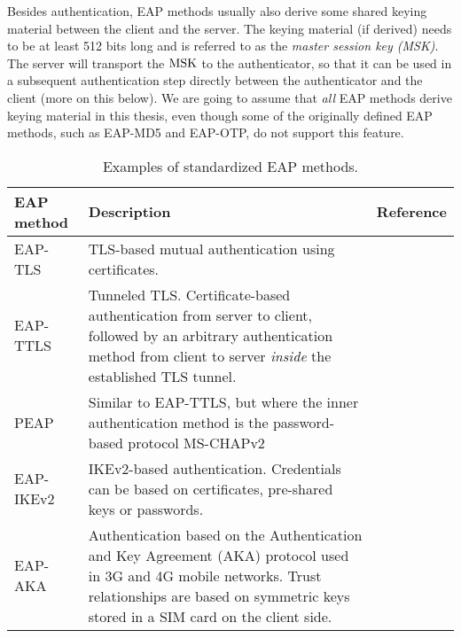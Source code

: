 Besides authentication,  EAP methods usually also derive some shared keying material between the client and the server.
The keying material (if derived) needs to be at least 512 bits long and is referred to as the \emph{master session key (MSK)}.
The server will transport the $\mathrm{MSK}$ to the authenticator,
so that it can be used in a subsequent authentication step directly between the authenticator and the client (more on this below). 
We are going to assume that \emph{all} EAP methods derive keying material in this thesis,
even though some of the originally defined EAP methods, such as EAP-MD5 and EAP-OTP, do not support this feature.




\begin{table}

	\normalsize
	\centering

	\caption{Examples of standardized EAP methods.
	}
	
	\label{table:EAP_methods}
	
	
	\begin{tabular}{l p{9cm} l}  
		\toprule
		

		
		EAP method & Description & Reference  \\
		
		\midrule
		
		EAP-TLS & TLS-based mutual authentication using certificates.	& \cite{IETF:RFC5216:EAP-TLS} \\
		
		EAP-TTLS & Tunneled TLS. Certificate-based authentication from server to client, 
		followed by an arbitrary authentication method from client to server \emph{inside} the established TLS tunnel.  & \cite{IETF:RFC5281:EAP-TTLS}  \\
		
		PEAP & Similar to EAP-TTLS, but where  the inner authentication method is the password-based protocol MS-CHAPv2~\cite{IETF:RFC2759:MS-CHAPv2}   & \cite{IETF:draft:PEAPv2} \\
		
		EAP-IKEv2 & IKEv2-based \cite{IETF:RFC7296:IKEv2} authentication. 
		Credentials can be based on certificates, pre-shared keys or passwords.   & \cite{IETF:RFC5106:EAP-IKEv2} \\
		
		EAP-AKA & Authentication based on the Authentication and Key Agreement (AKA) protocol used in 3G and 4G mobile networks. 
		Trust relationships are based on symmetric keys stored in a SIM card on the client side. & \cite{IETF:RFC4187:EAP-AKA} \\
		

\end{tabular}
\end{table}
